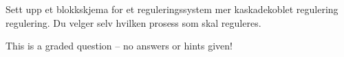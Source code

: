 

Sett upp et blokkskjema for et reguleringssystem mer kaskadekoblet regulering regulering. Du velger selv hvilken prosess som skal reguleres.






\vfil 

\eject






This is a graded question -- no answers or hints given!










